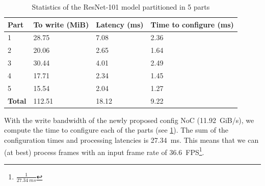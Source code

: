 \begin{table}[hbtp]
\centering
\begin{tabular}{@{}llll@{}}
\toprule
\textbf{Part}  & \textbf{To write (MiB)} & \textbf{Latency (ms)} & \textbf{Time to configure (ms)} \\ \midrule
1              & 28.75                   & 7.08                  & 2.36                            \\
2              & 20.06                   & 2.65                  & 1.64                            \\
3              & 30.44                   & 4.01                  & 2.49                            \\
4              & 17.71                   & 2.34                  & 1.45                            \\
5              & 15.54                   & 2.04                  & 1.27                            \\ \midrule
\textbf{Total} & 112.51                  & 18.12                 & 9.22                            \\ \bottomrule
\end{tabular}
\caption{Statistics of the ResNet-101 model partitioned in 5 parts}
\label{tab:resnet101_5parts}
\end{table}
With the write bandwidth of the newly proposed config NoC (\SI{11.92}{GiB/s}), we compute the time to configure each of the parts (see \cref{tab:resnet101_5parts}).
The sum of the configuration times and processing latencies is \SI{27.34}{ms}.
This means that we can (at best) process frames with an input frame rate of \SI{36.6}{FPS}\footnote{$\frac{1}{\SI{27.34}{ms}}$}.



